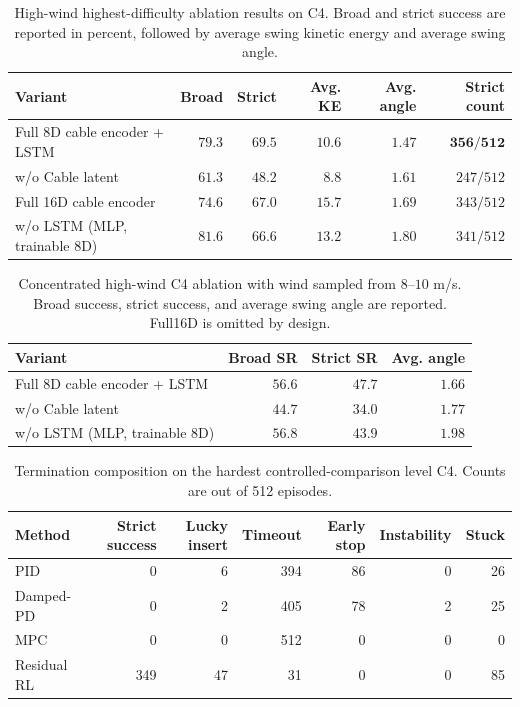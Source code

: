 \begin{table}[t]
  \centering
  \caption{High-wind highest-difficulty ablation results on C4. Broad and strict success are reported in percent, followed by average swing kinetic energy and average swing angle.}
  \label{tab:formal_interval_ablation}
  \setlength{\tabcolsep}{4pt}
  \begin{tabular}{lrrrrr}
    \toprule
    Variant & Broad & Strict & Avg. KE & Avg. angle & Strict count \\
    \midrule
    Full 8D cable encoder + LSTM
      & $79.3$ & $\mathbf{69.5}$ & $10.6$ & $\mathbf{1.47}$ & $\mathbf{356/512}$ \\
    w/o Cable latent
      & $61.3$ & $48.2$ & $8.8$ & $1.61$ & $247/512$ \\
    Full 16D cable encoder
      & $74.6$ & $67.0$ & $15.7$ & $1.69$ & $343/512$ \\
    w/o LSTM (MLP, trainable 8D)
      & $\mathbf{81.6}$ & $66.6$ & $13.2$ & $1.80$ & $341/512$ \\
    \bottomrule
  \end{tabular}
\end{table}

\begin{table}[t]
  \centering
  \caption{Concentrated high-wind C4 ablation with wind sampled from $8$--$10$ m/s. Broad success, strict success, and average swing angle are reported. Full16D is omitted by design.}
  \label{tab:formal_interval_ablation_wind8to10}
  \setlength{\tabcolsep}{4pt}
  \begin{tabular}{lrrr}
    \toprule
    Variant & Broad SR & Strict SR & Avg. angle \\
    \midrule
    Full 8D cable encoder + LSTM
      & $56.6$ & $\mathbf{47.7}$ & $\mathbf{1.66}$ \\
    w/o Cable latent
      & $44.7$ & $34.0$ & $1.77$ \\
    w/o LSTM (MLP, trainable 8D)
      & $\mathbf{56.8}$ & $43.9$ & $1.98$ \\
    \bottomrule
  \end{tabular}
\end{table}

\begin{table}[t]
  \centering
  \caption{Termination composition on the hardest controlled-comparison level C4. Counts are out of 512 episodes.}
  \label{tab:formal_interval_c4_terminations}
  \setlength{\tabcolsep}{5pt}
  \begin{tabular}{lrrrrrr}
    \toprule
    Method & Strict success & Lucky insert & Timeout & Early stop & Instability & Stuck \\
    \midrule
    PID & 0 & 6 & 394 & 86 & 0 & 26 \\
    Damped-PD & 0 & 2 & 405 & 78 & 2 & 25 \\
    MPC & 0 & 0 & 512 & 0 & 0 & 0 \\
    Residual RL & 349 & 47 & 31 & 0 & 0 & 85 \\
    \bottomrule
  \end{tabular}
\end{table}

